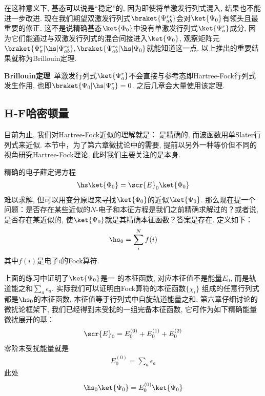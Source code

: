 在这种意义下, \hft 基态可以说是“稳定”的, 因为即使将单激发行列式混入, 结果也不能进一步改进. 现在我们期望双激发行列式$\braket{\Psi_{ab}^{rs}}$会对$\ket{\Psi_0}$有领头且最重要的修正. 这不是说精确基态$\ket{\Phi_0}$中没有单激发行列式$\ket{\Psi_a^r}$成分, 因为它们能通过与双激发行列式的混合间接进入$\ket{\Psi_0}$, 观察矩阵元$\braket{\Psi_a^r|\hs|\Psi_{ab}^{rs}},\braket{\Psi_{ab}^{rs}|\hs|\Psi_0}$就能知道这一点. 以上推出的重要结果就称为Brillouin定理. 

\textbf{Brillouin定理}\ 单激发行列式$\ket{\Psi_a^r}$不会直接与参考态即Hartree-Fock行列式发生作用, 也即$\braket{\Psi_0|\hs|\Psi_a^r}=0$. 之后几章会大量使用该定理.
\subsection{H-F哈密顿量}
目前为止, 我们对Hartree-Fock近似的理解就是： \ha 是精确的, 而波函数用单Slater行列式来近似. 本节中，为了第六章微扰论中的需要, 提前以另外一种等价但不同的视角研究Hartree-Fock理论, 此时我们主要关注的是\ha 本身.

精确的电子薛定谔方程
\begin{align}
\hs\ket{\Phi_0} = \scr{E}_0\ket{\Phi_0}
\end{align}难以求解, 但可以用变分原理来寻找$\ket{\Phi_0}$的近似$\ket{\Psi_0}$. 那么现在提一个问题：是否存在某些近似的$N$-电子\ha 和本征方程是我们之前精确求解过的？或者说, 是否存在某近似的\ha, 使$\ket{\Psi_0}$就是其精确本征函数？答案是存在. \emph{\hft{} \ha}定义如下：
\begin{align}
\hs_0 = \sum_i^Nf(i)
\end{align}
其中$f(i)是$电子$i$的Fock算符.

上面的练习中证明了$\ket{\Psi_0}$是一\hft{} \ha 的本征函数, 对应本征值不是\hft 能量$E_0$, 而是轨道能之和$\sum_a\epsilon_a$. 实际我们可以证明由Fock算符的本征函数$\{\chi_i\}$ 组成的任意行列式都是$\hs_0$的本征函数, 本征值等于行列式中自旋轨道能量之和, 第六章仔细讨论的微扰论框架下, 我们已经得到未受扰\ha 的一组完备本征函数, 它可作为如下精确能量微扰展开的基：
\begin{align}
\label{3.104}
\scr{E}_0 = E_0^{(0)} + E_0^{(1)} + E_0^{(2)}
\end{align}
零阶未受扰能量就是
\begin{align}
E_0^{(0)} = \sum_a\epsilon_a
\end{align}
此处
\begin{equation}
\hs_0\ket{\Psi_0}=E_0^{(0)}\ket{\Psi_0}
\end{equation}

